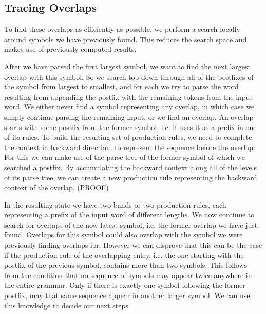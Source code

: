 \subsection{Tracing Overlaps}

To find these overlaps as efficiently as possible, we perform a search locally around symbols we have
previously found. This reduces the search space and makes use of previously computed results.

After we have parsed the first largest symbol, we want to find the next largest overlap with this symbol.
So we search top-down through all of the postfixes of the symbol from largest to smallest, and for each
we try to parse the word resulting from appending the postfix with the remaining tokens from the input word.
We either never find a symbol representing any overlap, in which case we simply continue parsing the remaining input,
or we find an overlap. An overlap starts with some postfix from the former symbol, i.e. it
uses it as a prefix in one of its rules. To build the resulting set of production rules, we need to complete the
context in backward direction, to represent the sequence before the overlap. For this we can make use of the parse
tree of the former symbol of which we searched a postfix. By accumulating the backward context along all of the
levels of its parse tree, we can create a new production rule representing the backward context of the overlap. (PROOF)

In the resulting state we have two bands or two production rules, each representing a prefix of the input word of
different lengths. We now continue to search for overlaps of the now latest symbol, i.e. the former overlap we have
just found. Overlaps for this symbol could also overlap with the symbol we were previously finding overlaps for.
However we can disprove that this can be the case if the production rule of the overlapping entry, i.e. the one
starting with the postfix of the previous symbol, contains more than two symbols. This follows from the condition 
that no sequence of symbols may appear twice anywhere in the entire grammar. Only if there is exactly one symbol 
following the former postfix, may that same sequence appear in another larger symbol. We can use this knowledge to 
decide our next steps.

